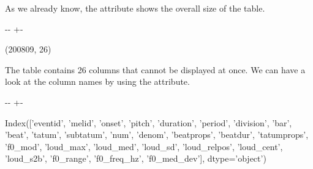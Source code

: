 \documentclass[letterpaper,10pt,english]{sphinxmanual}
\newlength\nbsphinxcodecellspacing
\begin{document}
As we already know, the  attribute shows the overall size of the table.

{
\begin{sphinxVerbatim}[commandchars=\\\{\}]
\llap{\color{nbsphinxin}[20]:\,\hspace{\fboxrule}\hspace{\fboxsep}}
\end{sphinxVerbatim}
}

{

\kern-\sphinxverbatimsmallskipamount\kern-\baselineskip
\kern+\FrameHeightAdjust\kern-\fboxrule
\vspace{\nbsphinxcodecellspacing}

\begin{sphinxVerbatim}[commandchars=\\\{\}]
\llap{\color{nbsphinxout}[20]:\,\hspace{\fboxrule}\hspace{\fboxsep}}(200809, 26)
\end{sphinxVerbatim}
}

The  table contains 26 columns that cannot be displayed at once. We can have a look at the column names by using the  attribute.

{
\begin{sphinxVerbatim}[commandchars=\\\{\}]
\llap{\color{nbsphinxin}[21]:\,\hspace{\fboxrule}\hspace{\fboxsep}}
\end{sphinxVerbatim}
}

{

\kern-\sphinxverbatimsmallskipamount\kern-\baselineskip
\kern+\FrameHeightAdjust\kern-\fboxrule
\vspace{\nbsphinxcodecellspacing}

\begin{sphinxVerbatim}[commandchars=\\\{\}]
\llap{\color{nbsphinxout}[21]:\,\hspace{\fboxrule}\hspace{\fboxsep}}Index(['eventid', 'melid', 'onset', 'pitch', 'duration', 'period', 'division',
       'bar', 'beat', 'tatum', 'subtatum', 'num', 'denom', 'beatprops',
       'beatdur', 'tatumprops', 'f0\_mod', 'loud\_max', 'loud\_med', 'loud\_sd',
       'loud\_relpos', 'loud\_cent', 'loud\_s2b', 'f0\_range', 'f0\_freq\_hz',
       'f0\_med\_dev'],
      dtype='object')
\end{sphinxVerbatim}
}
\end{document}
